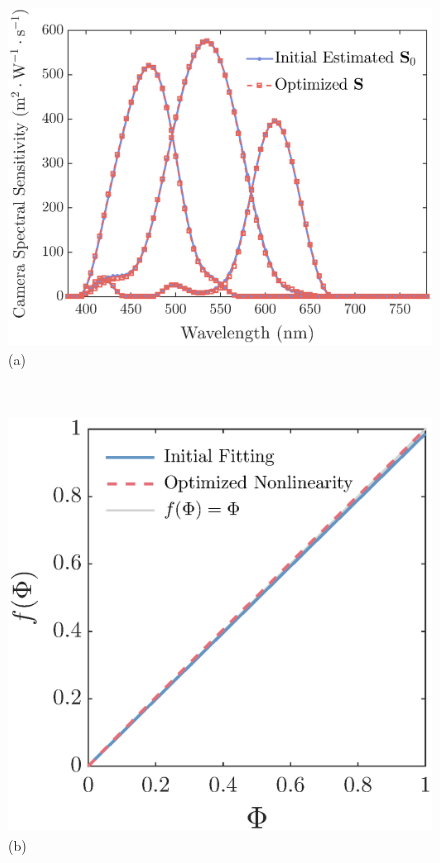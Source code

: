 \documentclass[9pt,twocolumn,twoside]{osajnl}
\begin{document}
\begin{figure}[tbp]
	\centering
	\begin{minipage}{0.55\linewidth}
		\centering
		\includegraphics[width=\linewidth]{Fig10a}\\
		(a)
	\end{minipage}\\
	\vspace{0.3em}
	\begin{minipage}[b]{0.5\linewidth}
		\centering
		\includegraphics[width=0.85\linewidth]{Fig10b}\\
		(b)
	\end{minipage}%

\end{figure}
\end{document}
